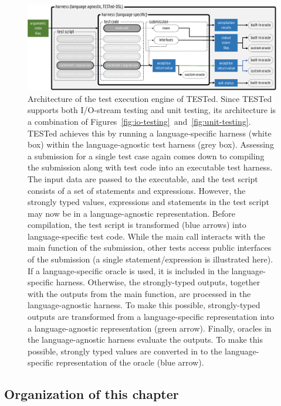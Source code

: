 \documentclass[../main]{subfiles}
\begin{document}
\begin{figure}
    \centering
    \includegraphics[width=\textwidth]{tested-testing}
    \caption{
        Architecture of the test execution engine of TESTed.
        Since TESTed supports both I/O-stream testing and unit testing, its architecture is a combination of Figures~\ref{fig:io-testing}~and~\ref{fig:unit-testing}.
        TESTed achieves this by running a language-specific harness (white box) within the language-agnostic test harness (grey box).
        Assessing a submission for a single test case again comes down to compiling the submission along with test code into an executable test harness.
        The \textcolor{input-green}{input data} are passed to the executable, and the test script consists of a set of statements and expressions.
        However, the strongly typed values, expressions and statements in the test script may now be in a language-agnostic representation.
        Before compilation, the test script is transformed (blue arrows) into language-specific test code.
        While the main call interacts with the main function of the submission, other tests access public interfaces of the submission (a single statement/expression is illustrated here).
        If a language-specific oracle is used, it is included in the language-specific harness.
        Otherwise, the strongly-typed \textcolor{output-blue}{outputs}, together with the \textcolor{output-blue}{outputs} from the main function, are processed in the language-agnostic harness.
        To make this possible, strongly-typed \textcolor{output-blue}{outputs} are transformed from a language-specific representation into a language-agnostic representation (green arrow).
        Finally, oracles in the language-agnostic harness evaluate the outputs.
        To make this possible, strongly typed values are converted in to the language-specific representation of the oracle (blue arrow).\label{fig:tested-testing}}
\end{figure}

\subsection{Organization of this chapter}\label{subsec:dsl-organization}
\end{document}
